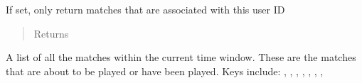 \documentclass[letterpaper,10pt,english]{sphinxmanual}
\begin{document}
\begin{fulllineitems}
\begin{quote}
\begin{description}
\end{description}\end{quote}

If set, only return matches that are associated with this user ID
\begin{quote}\begin{description}
\item[{Returns}] \leavevmode
{}

\end{description}\end{quote}

A list of all the matches within the current time window. These are the 
matches that are about to be played or have been played. Keys include: 
 , , , , 
, , , 

\end{fulllineitems}

\end{document}
